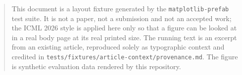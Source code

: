\documentclass{article}
\begin{document}

\printAffiliationsAndNotice{}

\begin{abstract}
This document is a layout fixture generated by the \texttt{matplotlib-prefab}
test suite. It is not a paper, not a submission and not an accepted work; the
ICML 2026 style is applied here only so that a figure can be looked at in a real
body page at its real printed size. The running text is an excerpt from an
existing article, reproduced solely as typographic context and credited in
\texttt{tests/fixtures/article-context/provenance.md}. The figure is synthetic
evaluation data rendered by this repository.
\end{abstract}





\end{document}
